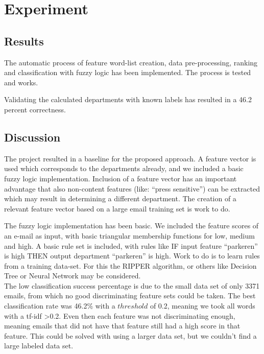 \documentclass[journal]{IEEEtran}
\begin{document}
\section{Experiment}

\subsection{Results}

The automatic process of feature word-list creation, data pre-processing, ranking and classification with fuzzy logic has been implemented. The process is tested and works.

Validating the calculated departments with known labels has resulted in a 46.2 percent correctness.

\subsection{Discussion}

The project resulted in a baseline for the proposed approach. A feature vector is used which corresponds to the departments already, and we included a basic fuzzy logic implementation. Inclusion of a feature vector has an important advantage that also non-content features (like: ``press sensitive'') can be extracted which may result in determining a different department. The creation of a relevant feature vector based on a large email training set is work to do. 

The fuzzy logic implementation has been basic. We included the feature scores of an e-mail as input, with basic triangular membership functions for low, medium and high. A basic rule set is included, with rules like IF input feature ``parkeren'' is high THEN output department ``parkeren'' is high. Work to do is to learn rules from a training data-set. For this the RIPPER algorithm, or others like Decision Tree or Neural Network may be considered. \cite{rulelearning}\cite{ripper}\\

The low classification success percentage is due to the small data set of only 3371 emails, from which no good discriminating feature sets could be taken. The best classification rate was 46.2\% with a $threshold$ of 0.2, meaning we took all words with a tf-idf \textgreater  0.2. Even then each feature was not discriminating enough, meaning emails that did not have that feature still had a high score in that feature. This could be solved with using a larger data set, but we couldn't find a large labeled data set. 
\end{document}
